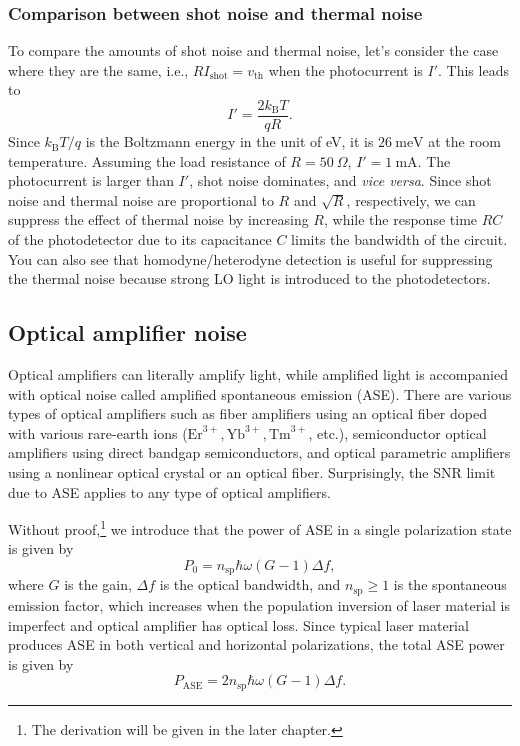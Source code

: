 \subsubsection{Comparison between shot noise and thermal noise}
To compare the amounts of shot noise and thermal noise, let's consider the case where they are the same, i.e., $RI_\mathrm{shot} = v_\mathrm{th}$ when the photocurrent is $I'$. This leads to 
\begin{equation}
	I' = \frac{2k_\mathrm B T }{qR}.
\end{equation}
Since $k_\mathrm{B}T/q$ is the Boltzmann energy in the unit of eV, it is $26 \ \mathrm{meV}$ at the room temperature. Assuming the load resistance of $R = 50 \ \Omega$, $I' = 1 \ \mathrm{mA}$. The photocurrent is larger than $I'$, shot noise dominates, and \textit{vice versa}. Since shot noise and thermal noise are proportional to $R$ and $\sqrt R$, respectively, we can suppress the effect of thermal noise by increasing $R$, while the response time $RC$ of the photodetector due to its capacitance $C$ limits the bandwidth of the circuit. You can also see that homodyne/heterodyne detection is useful for suppressing the thermal noise because strong LO light is introduced to the photodetectors.

\subsection{Optical amplifier noise}
Optical amplifiers can literally amplify light, while amplified light is accompanied with optical noise called amplified spontaneous emission (ASE). There are various types of optical amplifiers such as fiber amplifiers using an optical fiber doped with various rare-earth ions ($\mathrm{Er}^{3+}, \mathrm{Yb}^{3+}, \mathrm{Tm}^{3+}$, etc.), semiconductor optical amplifiers using direct bandgap semiconductors, and optical parametric amplifiers using a nonlinear optical crystal or an optical fiber. Surprisingly, the SNR limit due to ASE applies to any type of optical amplifiers. 

Without proof,\footnote{The derivation will be given in the later chapter.} we introduce that the power of ASE in a single polarization state is given by 
\begin{equation}
	P_0 = n_\mathrm{sp}\hbar \omega (G-1)\Delta f,
\end{equation}
where $G$ is the gain, $\Delta f$ is the optical bandwidth, and $n_\mathrm{sp}\geq 1$ is the spontaneous emission factor, which increases when the population inversion of laser material is imperfect and optical amplifier has optical loss. Since typical laser material produces ASE in both vertical and horizontal polarizations, the total ASE power is given by
\begin{equation}
	P_\mathrm{ASE} = 2n_\mathrm{sp}\hbar \omega (G-1)\Delta f.
\label{eq:ASE_power}
\end{equation}

